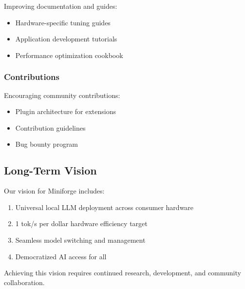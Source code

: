 Improving documentation and guides:

\begin{itemize}
    \item Hardware-specific tuning guides
    \item Application development tutorials
    \item Performance optimization cookbook
\end{itemize}

\subsubsection{Contributions}

Encouraging community contributions:

\begin{itemize}
    \item Plugin architecture for extensions
    \item Contribution guidelines
    \item Bug bounty program
\end{itemize}

\subsection{Long-Term Vision}

Our vision for Miniforge includes:

\begin{enumerate}
    \item Universal local LLM deployment across consumer hardware
    \item 1 tok/s per dollar hardware efficiency target
    \item Seamless model switching and management
    \item Democratized AI access for all
\end{enumerate}

Achieving this vision requires continued research, development, and community collaboration.
